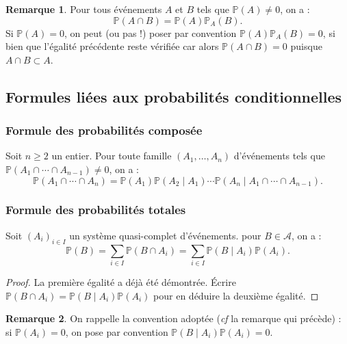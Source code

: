 \documentclass[french]{article}
\renewcommand{\P}{\mathbb{P}}
\theoremstyle{plain}
\theoremstyle{definition}
\newtheorem*{rmq}{Remarque}
\theoremstyle{remark}
\begin{document}
\begin{rmq}
	Pour tous événements $A$ et $B$ tels que $\P(A)\ne0$, on a : $$\P(A\cap B)=\P(A)\P_A(B).$$
	Si $\P(A)=0$, on peut (ou pas !) poser par convention $\P(A)\P_A(B)=0$, si bien que l'égalité précédente reste vérifiée car alors $\P(A\cap B)=0$ puisque $A\cap B\subset A$.
\end{rmq}

\subsection{Formules liées aux probabilités conditionnelles}

\subsubsection*{Formule des probabilités composée}

\begin{thm}%
	Soit $n\geqslant 2$ un entier. Pour toute famille $(A_1,\ldots,A_n)$ d'événements tels que $\P(A_1\cap\cdots\cap A_{n-1})\ne 0$, on a : 
	$$\P(A_1\cap\cdots\cap A_n)=\P(A_1)\P(A_2\mid A_1)\cdots\P(A_n\mid A_1\cap\cdots\cap A_{n-1}).$$
\end{thm}

\subsubsection*{Formule des probabilités totales}

\begin{thm}%
	Soit $(A_i)_{i\in I}$ un système quasi-complet d'événements. pour $B\in\mathcal{A}$, on a :
	$$\P(B)=\sum_{i\in I}\P(B\cap A_i)=\sum_{i\in I}\P(B\mid A_i)\P(A_i).$$
\end{thm}
\begin{proof}
	La première égalité a déjà été démontrée. Écrire $\P(B\cap A_i)=\P(B\mid A_i)\P(A_i)$ pour en déduire la deuxième égalité.
\end{proof}

\begin{rmq}
	On rappelle la convention adoptée (\textit{cf} la remarque qui précède) : si $\P(A_i)=0$, on pose par convention $\P(B\mid A_i)\P(A_i)=0$.
\end{rmq}
\end{document}
